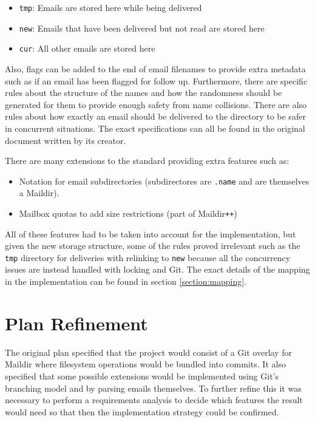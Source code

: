 \begin{itemize}
\item \texttt{tmp}: Emails are stored here while being delivered
\item \texttt{new}: Emails that have been delivered but not read are stored here
\item \texttt{cur}: All other emails are stored here
\end{itemize}

Also, flags can be added to the end of email filenames to provide extra metadata such as if an email has been flagged for follow up. Furthermore, there are specific rules about the structure of the names and how the randomness should be generated for them to provide enough safety from name collisions. There are also rules about how exactly an email should be delivered to the directory to be safer in concurrent situations. The exact specifications can all be found in the original document written by its creator\cite{bernstein2000maildir}.

There are many extensions to the standard providing extra features such as:

\begin{itemize}
\item Notation for email subdirectories (subdirectores are \texttt{.name} and are themselves a Maildir).
\item Mailbox quotas to add size restrictions (part of Maildir\texttt{++})
\end{itemize}

All of these features had to be taken into account for the implementation, but given the new storage structure, some of the rules proved irrelevant such as the \texttt{tmp} directory for deliveries with relinking to \texttt{new} because all the concurrency issues are instead handled with locking and Git. The exact details of the mapping in the implementation can be found in section \ref{section:mapping}.

\section{Plan Refinement}

The original plan specified that the project would consist of a Git overlay for Maildir where filesystem operations would be bundled into commits. It also specified that some possible extensions would be implemented using Git's branching model and by parsing emails themselves. To further refine this it was necessary to perform a requirements analysis to decide which features the result would need so that then the implementation strategy could be confirmed.


